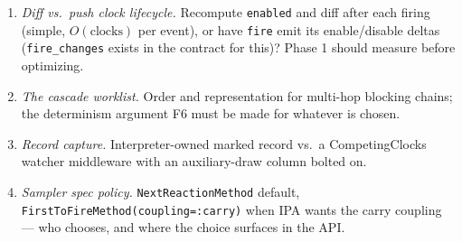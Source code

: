 \documentclass[11pt]{article}
\newcommand{\code}[1]{\texttt{#1}}
\begin{document}
\begin{enumerate}
\item \emph{Diff vs.\ push clock lifecycle.} Recompute \code{enabled} and
  diff after each firing (simple, $O(\text{clocks})$ per event), or have
  \code{fire} emit its enable/disable deltas (\code{fire\_changes} exists in
  the contract for this)? Phase 1 should measure before optimizing.
\item \emph{The cascade worklist.} Order and representation for multi-hop
  blocking chains; the determinism argument F6 must be made for whatever is
  chosen.
\item \emph{Record capture.} Interpreter-owned marked record vs.\ a
  CompetingClocks watcher middleware with an auxiliary-draw column bolted
  on.
\item \emph{Sampler spec policy.} \code{NextReactionMethod} default,
  \code{FirstToFireMethod(coupling=:carry)} when IPA wants the carry
  coupling --- who chooses, and where the choice surfaces in the API.
\end{enumerate}
\end{document}
